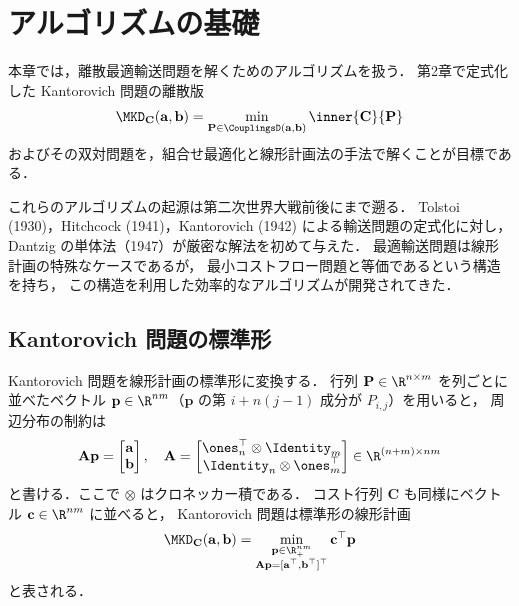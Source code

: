 \chapter{アルゴリズムの基礎}
\label{ch:algorithmic-foundations}

本章では，離散最適輸送問題を解くためのアルゴリズムを扱う．
第2章で定式化した Kantorovich 問題の離散版
\[
  \MKD_{\mathbf{C}}(\mathbf{a}, \mathbf{b})
  = \min_{\mathbf{P} \in \CouplingsD(\mathbf{a}, \mathbf{b})}
  \inner{\mathbf{C}}{\mathbf{P}}
\]
およびその双対問題を，組合せ最適化と線形計画法の手法で解くことが目標である．

これらのアルゴリズムの起源は第二次世界大戦前後にまで遡る．
Tolstoi (1930)，Hitchcock (1941)，Kantorovich (1942) による輸送問題の定式化に対し，
Dantzig の単体法（1947）が厳密な解法を初めて与えた．
最適輸送問題は線形計画の特殊なケースであるが，
最小コストフロー問題と等価であるという構造を持ち，
この構造を利用した効率的なアルゴリズムが開発されてきた．

\section{Kantorovich 問題の標準形}
\label{sec:standard-form}

Kantorovich 問題を線形計画の標準形に変換する．
行列 $\mathbf{P} \in \R^{n \times m}$ を列ごとに並べたベクトル
$\mathbf{p} \in \R^{nm}$（$\mathbf{p}$ の第 $i + n(j-1)$ 成分が $P_{i,j}$）を用いると，
周辺分布の制約は
\[
  \mathbf{A} \mathbf{p}
  = \begin{bmatrix} \mathbf{a} \\ \mathbf{b} \end{bmatrix},
  \quad
  \mathbf{A} =
  \begin{bmatrix}
    \ones_n^\top \otimes \Identity_m \\
    \Identity_n \otimes \ones_m^\top
  \end{bmatrix}
  \in \R^{(n+m) \times nm}
\]
と書ける．ここで $\otimes$ はクロネッカー積である．
コスト行列 $\mathbf{C}$ も同様にベクトル $\mathbf{c} \in \R^{nm}$ に並べると，
Kantorovich 問題は標準形の線形計画
\[
  \MKD_{\mathbf{C}}(\mathbf{a}, \mathbf{b})
  = \min_{\substack{\mathbf{p} \in \R_+^{nm} \\
  \mathbf{A}\mathbf{p} = [\mathbf{a}^\top, \mathbf{b}^\top]^\top}}
  \mathbf{c}^\top \mathbf{p}
\]
と表される．

